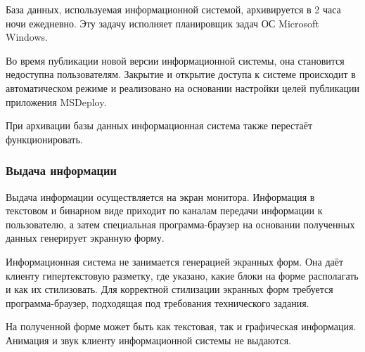 База данных, используемая информационной системой, архивируется в 2 часа ночи ежедневно.
Эту задачу исполняет планировщик задач ОС Microsoft Windows.

Во время публикации новой версии информационной системы, она становится недоступна пользователям.
Закрытие и открытие доступа к системе происходит в автоматическом режиме и реализовано на основании настройки целей публикации приложения MSDeploy.

При архивации базы данных информационная система также перестаёт функционировать.

\subsubsection{Выдача информации}

Выдача информации осуществляется на экран монитора.
Информация в текстовом и бинарном виде приходит по каналам передачи информации к пользователю, а затем специальная программа-браузер на основании полученных данных генерирует экранную форму.

Информационная система не занимается генерацией экранных форм.
Она даёт клиенту гипертекстовую разметку, где указано, какие блоки на форме располагать и как их стилизовать.
Для корректной стилизации экранных форм требуется программа-браузер, подходящая под требования технического задания.

На полученной форме может быть как текстовая, так и графическая информация. Анимация и звук клиенту информационной системы не выдаются.

\clearpage
\newpage